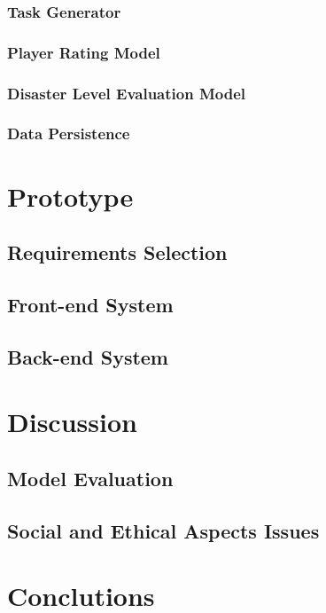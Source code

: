 \documentclass[paper=a4, fontsize=11pt]{scrartcl} %
\numberwithin{equation}{section} %
\numberwithin{figure}{section} %
\numberwithin{table}{section} %
\begin{document}
    \subsubsection{Task Generator}
    \subsubsection{Player Rating Model}
    \subsubsection{Disaster Level Evaluation Model}
    \subsubsection{Data Persistence}

\section{Prototype}


  \subsection{Requirements Selection}
  \subsection{Front-end System}
  \subsection{Back-end System}

\section{Discussion}

  \subsection{Model Evaluation}
  \subsection{Social and Ethical Aspects Issues}

\section{Conclutions}


\nocite{*}


\end{document}
